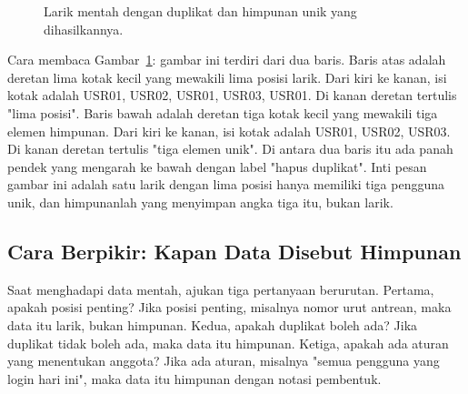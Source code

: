 \documentclass[11pt,a4paper]{article}
\begin{document}
\begin{figure}[H]
	\centering
	\caption{Larik mentah dengan duplikat dan himpunan unik yang dihasilkannya.}
	\label{fig:larik-vs-himpunan}
\end{figure}

Cara membaca Gambar~\ref{fig:larik-vs-himpunan}: gambar ini terdiri dari dua baris. Baris atas adalah deretan lima kotak kecil yang mewakili lima posisi larik. Dari kiri ke kanan, isi kotak adalah USR01, USR02, USR01, USR03, USR01. Di kanan deretan tertulis "lima posisi". Baris bawah adalah deretan tiga kotak kecil yang mewakili tiga elemen himpunan. Dari kiri ke kanan, isi kotak adalah USR01, USR02, USR03. Di kanan deretan tertulis "tiga elemen unik". Di antara dua baris itu ada panah pendek yang mengarah ke bawah dengan label "hapus duplikat". Inti pesan gambar ini adalah satu larik dengan lima posisi hanya memiliki tiga pengguna unik, dan himpunanlah yang menyimpan angka tiga itu, bukan larik.

\subsection{Cara Berpikir: Kapan Data Disebut Himpunan}

Saat menghadapi data mentah, ajukan tiga pertanyaan berurutan. Pertama, apakah posisi penting? Jika posisi penting, misalnya nomor urut antrean, maka data itu larik, bukan himpunan. Kedua, apakah duplikat boleh ada? Jika duplikat tidak boleh ada, maka data itu himpunan. Ketiga, apakah ada aturan yang menentukan anggota? Jika ada aturan, misalnya "semua pengguna yang login hari ini", maka data itu himpunan dengan notasi pembentuk.
\end{document}
